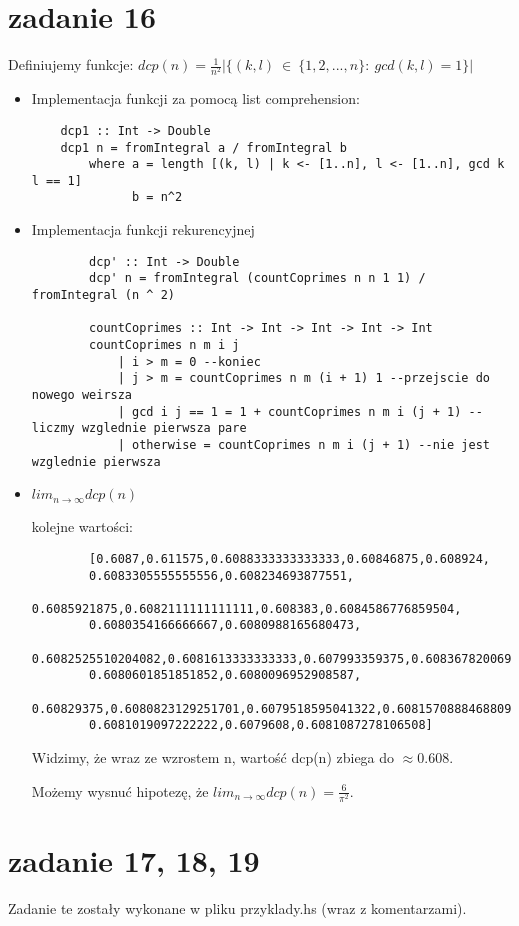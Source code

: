 \documentclass[11pt,a4paper]{article}
\begin{document}
\section*{zadanie 16}
Definiujemy funkcje: $dcp(n) = \frac{1}{n^2} |\{(k, l)\ \in\ \{1, 2, ..., n\}:\ gcd(k, l) = 1\}|$
\begin{itemize}
    \item Implementacja funkcji za pomocą list comprehension: \par
    \begin{verbatim}
    dcp1 :: Int -> Double
    dcp1 n = fromIntegral a / fromIntegral b
        where a = length [(k, l) | k <- [1..n], l <- [1..n], gcd k l == 1]
              b = n^2
    \end{verbatim}

    \item Implementacja funkcji rekurencyjnej
    \begin{verbatim}
        dcp' :: Int -> Double
        dcp' n = fromIntegral (countCoprimes n n 1 1) / fromIntegral (n ^ 2)
        
        countCoprimes :: Int -> Int -> Int -> Int -> Int
        countCoprimes n m i j
            | i > m = 0 --koniec
            | j > m = countCoprimes n m (i + 1) 1 --przejscie do nowego weirsza
            | gcd i j == 1 = 1 + countCoprimes n m i (j + 1) --liczmy wzglednie pierwsza pare
            | otherwise = countCoprimes n m i (j + 1) --nie jest wzglednie pierwsza
    \end{verbatim}

    \item $lim_{n \to \infty} dcp(n)$ \par
    kolejne wartości: \par
    \begin{verbatim}
        [0.6087,0.611575,0.6088333333333333,0.60846875,0.608924,
        0.6083305555555556,0.608234693877551,
        0.6085921875,0.6082111111111111,0.608383,0.6084586776859504,
        0.6080354166666667,0.6080988165680473,
        0.6082525510204082,0.6081613333333333,0.607993359375,0.6083678200692042,
        0.6080601851851852,0.6080096952908587,
        0.60829375,0.6080823129251701,0.6079518595041322,0.6081570888468809,
        0.6081019097222222,0.6079608,0.6081087278106508]
    \end{verbatim}
    Widzimy, że wraz ze wzrostem n, wartość dcp(n) zbiega do $\approx 0.608$. \par
    Możemy wysnuć hipotezę, że $lim_{n \to \infty} dcp(n) = \frac{6}{\pi^2}$.
\end{itemize}

\bigskip
\section*{zadanie 17, 18, 19}
Zadanie te zostały wykonane w pliku przyklady.hs (wraz z komentarzami).
\end{document}
